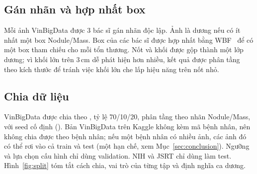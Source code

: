 \subsection{Gán nhãn và hợp nhất box}

Mỗi ảnh VinBigData được 3 bác sĩ gán nhãn độc lập. Ảnh là dương nếu có ít nhất một box Nodule/Mass. Box của các
bác sĩ được hợp nhất bằng WBF~\cite{solovyev2021wbf} để có một box tham chiếu cho mỗi tổn thương. Nốt và khối
được gộp thành một lớp dương; vì khối lớn trên 3\,cm dễ phát hiện hơn nhiều, kết quả được phân tầng theo kích thước
để tránh việc khối lớn che lấp hiệu năng trên nốt nhỏ.

\subsection{Chia dữ liệu}

VinBigData được chia theo , tỷ lệ 70/10/20, phân tầng theo nhãn Nodule/Mass, với seed cố định
(). Bản VinBigData trên Kaggle không kèm mã bệnh nhân, nên không chia được theo
bệnh nhân; nếu một bệnh nhân có nhiều ảnh, các ảnh đó có thể rơi vào cả train và test (một hạn chế, xem
Mục~\ref{sec:conclusion}). Ngưỡng và lựa chọn cấu hình chỉ dùng validation. NIH và JSRT chỉ dùng làm test.
Hình~\ref{fig:split} tóm tắt cách chia, vai trò của từng tập và định nghĩa ca dương.

